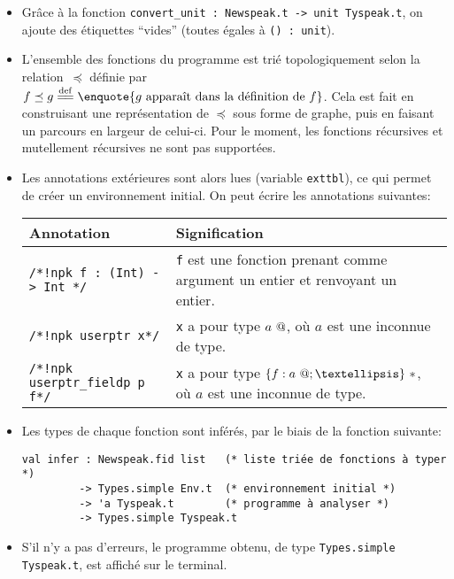 \begin{itemize}

\item Grâce à la fonction \verb!convert_unit : Newspeak.t -> unit Tyspeak.t!, on
ajoute des étiquettes \enquote{vides} (toutes égales à \verb!() : unit!).

\item L'ensemble des fonctions du programme est trié topologiquement selon la
    relation~$\preceq$ définie par $f \preceq g \eqdef \enquote{g \textrm{
    apparaît dans la définition de } f}$. Cela est fait en construisant une
    représentation de $\preceq$ sous forme de graphe, puis en faisant un
    parcours en largeur de celui-ci. Pour le moment, les fonctions récursives et
    mutellement récursives ne sont pas supportées.

\item Les annotations extérieures sont alors lues (variable \texttt{exttbl}), ce
    qui permet de créer un environnement initial. On peut écrire les annotations
    suivantes:

  \begin{center}
    \begin{tabular}{lp{7cm}}
        \toprule
        Annotation & Signification \\
        \midrule
        \texttt{/*!npk f : (Int) -> Int */} &
        \texttt{f} est une fonction prenant comme argument un entier et
        renvoyant un entier.
        \\
        \texttt{/*!npk userptr x*/} &
        \texttt{x} a pour type $a~@$, où $a$ est une inconnue de type.
        \\
        \texttt{/*!npk userptr_fieldp p f*/} &
      \texttt{x} a pour type $\{ f: \ptrU{a} ; … \}~*$, où $a$ est une inconnue
      de type. \\
      \bottomrule
    \end{tabular}
  \end{center}

\item Les types de chaque fonction sont inférés, par le biais de la fonction
  suivante:

\begin{Verbatim}
val infer : Newspeak.fid list   (* liste triée de fonctions à typer *)
         -> Types.simple Env.t  (* environnement initial *)
         -> 'a Tyspeak.t        (* programme à analyser *)
         -> Types.simple Tyspeak.t
\end{Verbatim}

\item S'il n'y a pas d'erreurs, le programme obtenu, de type
\texttt{Types.simple Tyspeak.t}, est affiché sur le terminal.

\end{itemize}


